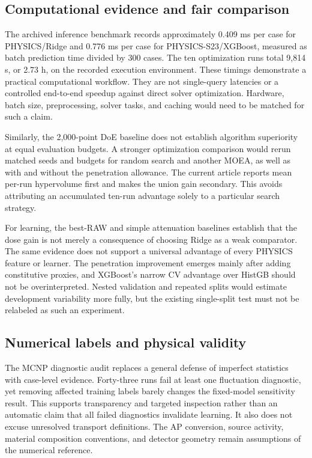 \subsection{Computational evidence and fair comparison}
The archived inference benchmark records approximately 0.409 ms per case for PHYSICS/Ridge and 0.776 ms per case for PHYSICS-S23/XGBoost, measured as batch prediction time divided by 300 cases. The ten optimization runs total 9,814 s, or 2.73 h, on the recorded execution environment. These timings demonstrate a practical computational workflow. They are not single-query latencies or a controlled end-to-end speedup against direct solver optimization. Hardware, batch size, preprocessing, solver tasks, and caching would need to be matched for such a claim.

Similarly, the 2,000-point DoE baseline does not establish algorithm superiority at equal evaluation budgets. A stronger optimization comparison would rerun matched seeds and budgets for random search and another MOEA, as well as with and without the penetration allowance. The current article reports mean per-run hypervolume first and makes the union gain secondary. This avoids attributing an accumulated ten-run advantage solely to a particular search strategy.

For learning, the best-RAW and simple attenuation baselines establish that the dose gain is not merely a consequence of choosing Ridge as a weak comparator. The same evidence does not support a universal advantage of every PHYSICS feature or learner. The penetration improvement emerges mainly after adding constitutive proxies, and XGBoost's narrow CV advantage over HistGB should not be overinterpreted. Nested validation and repeated splits would estimate development variability more fully, but the existing single-split test must not be relabeled as such an experiment.

\subsection{Numerical labels and physical validity}
The MCNP diagnostic audit replaces a general defense of imperfect statistics with case-level evidence. Forty-three runs fail at least one fluctuation diagnostic, yet removing affected training labels barely changes the fixed-model sensitivity result. This supports transparency and targeted inspection rather than an automatic claim that all failed diagnostics invalidate learning. It also does not excuse unresolved transport definitions. The AP conversion, source activity, material composition conventions, and detector geometry remain assumptions of the numerical reference.

